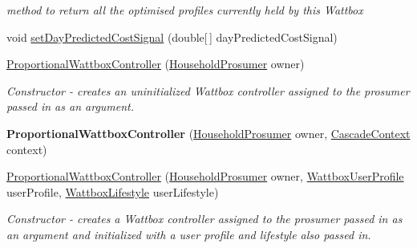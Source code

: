 \begin{DoxyCompactItemize}
\begin{DoxyCompactList}\small\item\em method to return all the optimised profiles currently held by this Wattbox \end{DoxyCompactList}\item 
void \hyperlink{classuk_1_1ac_1_1dmu_1_1iesd_1_1cascade_1_1controllers_1_1_proportional_wattbox_controller_a6abcbabbbce47c7ee48939a0ddfe3a2f}{set\-Day\-Predicted\-Cost\-Signal} (double\mbox{[}$\,$\mbox{]} day\-Predicted\-Cost\-Signal)
\item 
\hyperlink{classuk_1_1ac_1_1dmu_1_1iesd_1_1cascade_1_1controllers_1_1_proportional_wattbox_controller_a539637d663580e1a627eeb723897aae9}{Proportional\-Wattbox\-Controller} (\hyperlink{classuk_1_1ac_1_1dmu_1_1iesd_1_1cascade_1_1agents_1_1prosumers_1_1_household_prosumer}{Household\-Prosumer} owner)
\begin{DoxyCompactList}\small\item\em Constructor -\/ creates an uninitialized Wattbox controller assigned to the prosumer passed in as an argument. \end{DoxyCompactList}\item 
\hypertarget{classuk_1_1ac_1_1dmu_1_1iesd_1_1cascade_1_1controllers_1_1_proportional_wattbox_controller_ad86c9b4e2e3f2f093b3322ca7ca84f4e}{{\bfseries Proportional\-Wattbox\-Controller} (\hyperlink{classuk_1_1ac_1_1dmu_1_1iesd_1_1cascade_1_1agents_1_1prosumers_1_1_household_prosumer}{Household\-Prosumer} owner, \hyperlink{classuk_1_1ac_1_1dmu_1_1iesd_1_1cascade_1_1context_1_1_cascade_context}{Cascade\-Context} context)}\label{classuk_1_1ac_1_1dmu_1_1iesd_1_1cascade_1_1controllers_1_1_proportional_wattbox_controller_ad86c9b4e2e3f2f093b3322ca7ca84f4e}

\item 
\hyperlink{classuk_1_1ac_1_1dmu_1_1iesd_1_1cascade_1_1controllers_1_1_proportional_wattbox_controller_a03c1166acb4b63f0e3c6293dfd88dd0f}{Proportional\-Wattbox\-Controller} (\hyperlink{classuk_1_1ac_1_1dmu_1_1iesd_1_1cascade_1_1agents_1_1prosumers_1_1_household_prosumer}{Household\-Prosumer} owner, \hyperlink{enumuk_1_1ac_1_1dmu_1_1iesd_1_1cascade_1_1controllers_1_1_wattbox_user_profile}{Wattbox\-User\-Profile} user\-Profile, \hyperlink{enumuk_1_1ac_1_1dmu_1_1iesd_1_1cascade_1_1controllers_1_1_wattbox_lifestyle}{Wattbox\-Lifestyle} user\-Lifestyle)
\begin{DoxyCompactList}\small\item\em Constructor -\/ creates a Wattbox controller assigned to the prosumer passed in as an argument and initialized with a user profile and lifestyle also passed in. \end{DoxyCompactList}\end{DoxyCompactItemize}

